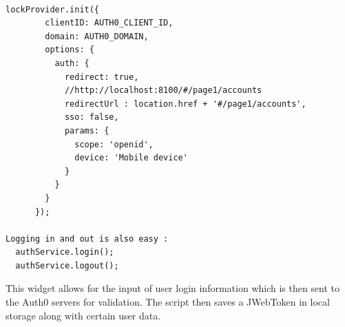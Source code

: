 \begin{verbatim}

lockProvider.init({
        clientID: AUTH0_CLIENT_ID,
        domain: AUTH0_DOMAIN,
        options: {
          auth: {
            redirect: true,
            //http://localhost:8100/#/page1/accounts
            redirectUrl : location.href + '#/page1/accounts',
            sso: false,
            params: {
              scope: 'openid',
              device: 'Mobile device'
            }
          }
        }
      });

Logging in and out is also easy :
  authService.login();
  authService.logout();
\end{verbatim}
    This widget allows for the input of user login information which is then sent to the Auth0 servers for validation.
    The script then saves a JWebToken in local storage along with certain user data.




